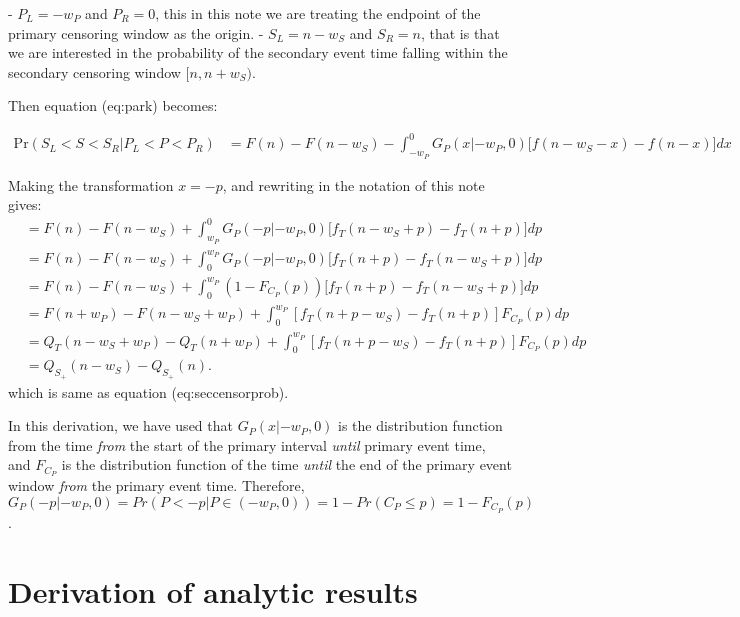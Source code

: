 \documentclass[10pt,letterpaper]{article}
\begin{document}
- $P_L = -w_P$ and $P_R = 0$, this in this note we are treating the endpoint of the primary censoring window as the origin.
-  $S_L = n-w_S$ and $S_R = n$, that is that we are interested in the probability of the secondary event time falling within the secondary censoring window $[n, n+ w_S)$.

Then equation \@ref(eq:park) becomes:

\begin{equation}
\begin{aligned}
\mathrm{Pr}(S_L < S < S_R | P_L < P < P_R) &= F(n) - F(n-w_S) - \int_{-w_P}^{0} G_P(x|-w_P, 0) \big[f(n - w_S - x) - f(n - x)\big] dx
\end{aligned}
\end{equation}



Making the transformation $x = -p$, and rewriting in the notation of this note gives:
\begin{equation}
\begin{aligned}
&= F(n) - F(n-w_S) + \int_{w_P}^{0} G_P(-p|-w_P, 0) \big[f_T(n - w_S + p) - f_T(n +p)\big] dp \\
&= F(n) - F(n-w_S) + \int_{0}^{w_P} G_P(-p|-w_P, 0) \big[f_T(n + p) - f_T(n - w_S +p)\big] dp\\
&= F(n) - F(n-w_S) + \int_{0}^{w_P} (1 - F_{C_P}(p)) \big[f_T(n + p) - f_T(n - w_S +p)\big] dp\\
&= F(n + w_P) - F(n-w_S + w_P) + \int_{0}^{w_P} [f_T(n + p - w_S) - f_T(n + p)] F_{C_P}(p) dp\\
&= Q_T(n-w_S + w_P) - Q_T(n + w_P) + \int_{0}^{w_P} [f_T(n + p - w_S) - f_T(n + p)] F_{C_P}(p) dp \\
&= Q_{S_+}(n-w_S) - Q_{S_+}(n ).
\end{aligned}
\end{equation}
which is same as equation \@ref(eq:seccensorprob).

In this derivation, we have used that $G_P(x|-w_P, 0)$ is the distribution function from the time \textit{from} the start of the primary interval \textit{until} primary event time, and $F_{C_P}$ is the distribution function of the time \textit{until} the end of the primary event window \textit{from} the primary event time. Therefore, $G_P(-p|-w_P, 0) = Pr(P < -p | P \in (-w_P, 0)) = 1 - Pr(C_P \leq p) = 1 - F_{C_P}(p)$.

\section{Derivation of analytic results}
\end{document}
